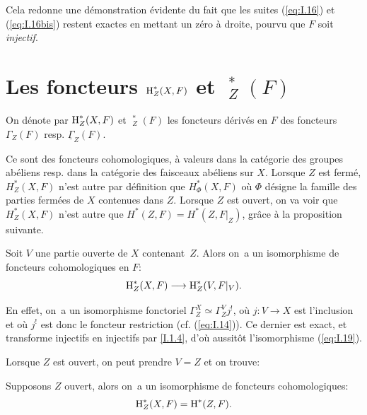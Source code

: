 Cela redonne une d\'emonstration \'evidente du fait que les suites (\ref{eq:I.16}) et (\ref{eq:I.16bis}) restent exactes en mettant un z\'ero \`a droite, pourvu que $F$ soit \textit{injectif}.

\section{Les foncteurs $\operatorname{H}_Z^*(X, F)$ et $\mathop{\underline{\mathrm{H}}}\nolimits_Z^*(F)$} \label{I.2}

\ignorespaces

\begin{definition} \label{I.2.1}
On d\'enote par $\operatorname{H}_Z^*(X, F)$ et ${\mathop{\underline{\mathrm{H}}}\nolimits}_Z^*(F)$ les foncteurs d\'eriv\'es en $F$ des foncteurs $\Gamma_Z(F)$ resp. $\underline{\Gamma}_Z(F)$.
\end{definition}

Ce sont des foncteurs cohomologiques, \`a valeurs dans la cat\'egorie des groupes ab\'eliens resp. dans la cat\'egorie des faisceaux ab\'eliens sur $X$. Lorsque $Z$ est ferm\'e, $H_Z^*(X, F)$ n'est autre par d\'efinition que $H^*_{\Phi}(X, F)$ o\`u $\Phi$ d\'esigne la famille des parties ferm\'ees de $X$ contenues dans $Z$. Lorsque $Z$ est ouvert, on va voir que $H_Z^*(X, F)$ n'est autre que $H^*(Z, F)=H^*(Z, F|_{Z})$, gr\^ace \`a la proposition suivante.

\begin{proposition} \label{I.2.2}
Soit $V$ une partie ouverte de $X$ contenant~$Z$. Alors on~a un isomorphisme de foncteurs cohomologiques en $F$:
\begin{equation} \label{eq:I.19}
\H^*_Z(X, F) \to \H^*_Z(V, F|_{V}).
\end{equation}
\end{proposition}

En effet, on~a un isomorphisme fonctoriel $\Gamma_Z^X \simeq \Gamma_Z^V j^!$, o\`u $j: V \to X$ est l'inclusion et o\`u $j^!$ est donc le foncteur restriction (cf. (\ref{eq:I.14})). Ce dernier est exact, et transforme injectifs en injectifs par \ref{I.1.4}, d'o\`u aussit\^{o}t l'isomorphisme (\ref{eq:I.19}).

Lorsque $Z$ est ouvert, on peut prendre $V=Z$ et on trouve:

\begin{corollaire} \label{I.2.3bof}
Supposons $Z$ ouvert, alors on~a un isomorphisme de foncteurs cohomologiques:
\begin{equation} \label{eq:I.20}
\operatorname{H}_Z^*(X, F) = \operatorname{H}^*(Z, F).
\end{equation}
\end{corollaire}

